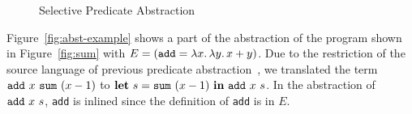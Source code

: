 \begin{figure}[t]
\begin{minipage}{0.47\textwidth}
 {}

\smallskip

 {}

%

\smallskip

  {}
\end{minipage}
\caption{Selective Predicate Abstraction}
\label{fig:abstraction}
\end{figure}

Figure~\ref{fig:abst-example} shows a part of the abstraction of the
program shown in Figure~\ref{fig:sum} with $E =
(\mathtt{add}=\lambda{x}.\,{\lambda{y}.\,{x+y}})$.  Due to the restriction of the
source language of previous predicate
abstraction~\cite{KobayashiPLDI2011}, we translated the term
${{\mathtt{add}}~{x}}~{{\mathtt{sum}}~{(x-1)}}$ to
$\mathbf{let}\ {s} = {{\mathtt{sum}}~{(x-1)}}\ \mathbf{in}\ {{{\mathtt{add}}~{x}}~{s}}$.
In the abstraction of ${{\mathtt{add}}~{x}}~{s}$, \texttt{add} is
inlined since the definition of \texttt{add} is in $E$.


